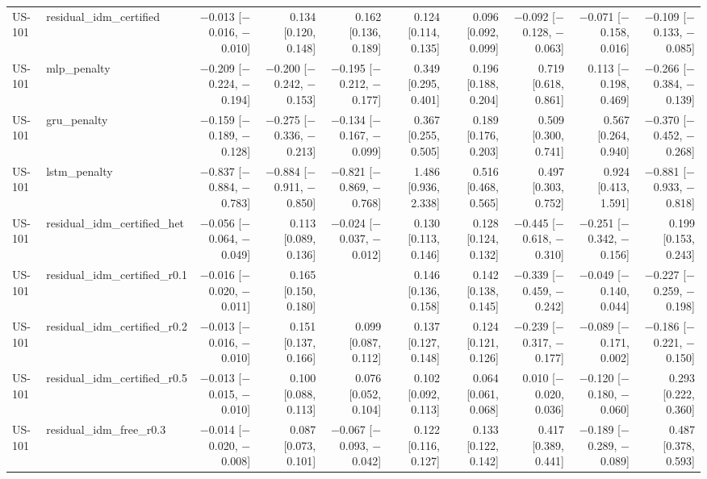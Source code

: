 \begin{table}[htbp]
{\begin{tabular}{llrrrrrrrr}
US-101 & residual\_idm\_certified & $-$0.013 [$-$0.016, $-$0.010] & 0.134 [0.120, 0.148] & 0.162 [0.136, 0.189] & 0.124 [0.114, 0.135] & 0.096 [0.092, 0.099] & $-$0.092 [$-$0.128, $-$0.063] & $-$0.071 [$-$0.158, 0.016] & $-$0.109 [$-$0.133, $-$0.085] \\
US-101 & mlp\_penalty & $-$0.209 [$-$0.224, $-$0.194] & $-$0.200 [$-$0.242, $-$0.153] & $-$0.195 [$-$0.212, $-$0.177] & 0.349 [0.295, 0.401] & 0.196 [0.188, 0.204] & 0.719 [0.618, 0.861] & 0.113 [$-$0.198, 0.469] & $-$0.266 [$-$0.384, $-$0.139] \\
US-101 & gru\_penalty & $-$0.159 [$-$0.189, $-$0.128] & $-$0.275 [$-$0.336, $-$0.213] & $-$0.134 [$-$0.167, $-$0.099] & 0.367 [0.255, 0.505] & 0.189 [0.176, 0.203] & 0.509 [0.300, 0.741] & 0.567 [0.264, 0.940] & $-$0.370 [$-$0.452, $-$0.268] \\
US-101 & lstm\_penalty & $-$0.837 [$-$0.884, $-$0.783] & $-$0.884 [$-$0.911, $-$0.850] & $-$0.821 [$-$0.869, $-$0.768] & 1.486 [0.936, 2.338] & 0.516 [0.468, 0.565] & 0.497 [0.303, 0.752] & 0.924 [0.413, 1.591] & $-$0.881 [$-$0.933, $-$0.818] \\
US-101 & residual\_idm\_certified\_het & $-$0.056 [$-$0.064, $-$0.049] & 0.113 [0.089, 0.136] & $-$0.024 [$-$0.037, $-$0.012] & 0.130 [0.113, 0.146] & 0.128 [0.124, 0.132] & $-$0.445 [$-$0.618, $-$0.310] & $-$0.251 [$-$0.342, $-$0.156] & 0.199 [0.153, 0.243] \\
US-101 & residual\_idm\_certified\_r0.1 & $-$0.016 [$-$0.020, $-$0.011] & 0.165 [0.150, 0.180] &  & 0.146 [0.136, 0.158] & 0.142 [0.138, 0.145] & $-$0.339 [$-$0.459, $-$0.242] & $-$0.049 [$-$0.140, 0.044] & $-$0.227 [$-$0.259, $-$0.198] \\
US-101 & residual\_idm\_certified\_r0.2 & $-$0.013 [$-$0.016, $-$0.010] & 0.151 [0.137, 0.166] & 0.099 [0.087, 0.112] & 0.137 [0.127, 0.148] & 0.124 [0.121, 0.126] & $-$0.239 [$-$0.317, $-$0.177] & $-$0.089 [$-$0.171, 0.002] & $-$0.186 [$-$0.221, $-$0.150] \\
US-101 & residual\_idm\_certified\_r0.5 & $-$0.013 [$-$0.015, $-$0.010] & 0.100 [0.088, 0.113] & 0.076 [0.052, 0.104] & 0.102 [0.092, 0.113] & 0.064 [0.061, 0.068] & 0.010 [$-$0.020, 0.036] & $-$0.120 [$-$0.180, $-$0.060] & 0.293 [0.222, 0.360] \\
US-101 & residual\_idm\_free\_r0.3 & $-$0.014 [$-$0.020, $-$0.008] & 0.087 [0.073, 0.101] & $-$0.067 [$-$0.093, $-$0.042] & 0.122 [0.116, 0.127] & 0.133 [0.122, 0.142] & 0.417 [0.389, 0.441] & $-$0.189 [$-$0.289, $-$0.089] & 0.487 [0.378, 0.593] \\

\end{tabular}}
\end{table}
